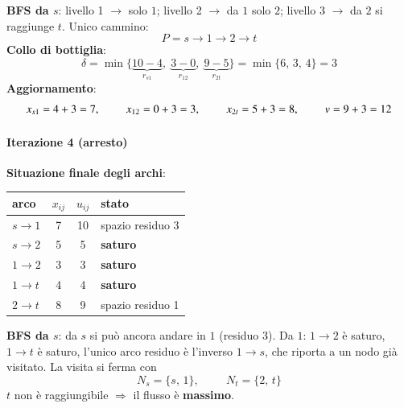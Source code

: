 \documentclass[12pt]{extarticle} %
\begin{document}
\noindent\textbf{BFS da $s$}: livello 1 $\to$ solo $1$; livello 2 $\to$ da $1$ solo $2$; livello 3 $\to$ da $2$ si raggiunge $t$. Unico cammino:
\[
P = s \to 1 \to 2 \to t
\]
\textbf{Collo di bottiglia}:
\[
\delta = \min\{\underbrace{10-4}_{r_{s1}},\; \underbrace{3-0}_{r_{12}},\; \underbrace{9-5}_{r_{2t}}\} = \min\{6,\,3,\,4\} = 3
\]
\textbf{Aggiornamento}:
\[
x_{s1} = 4+3 = 7, \hspace{0.8cm} x_{12} = 0+3 = 3, \hspace{0.8cm} x_{2t} = 5+3 = 8, \hspace{0.8cm} v = 9+3 = 12
\]

\paragraph{Iterazione 4 (arresto)}
\textbf{Situazione finale degli archi}:
\begin{center}
\begin{tabular}{lccl}
\hline
\textbf{arco} & \textbf{$x_{ij}$} & \textbf{$u_{ij}$} & \textbf{stato} \\
\hline
$s\to1$ & 7 & 10 & spazio residuo 3 \\
$s\to2$ & 5 & 5 & \textbf{saturo} \\
$1\to2$ & 3 & 3 & \textbf{saturo} \\
$1\to t$ & 4 & 4 & \textbf{saturo} \\
$2\to t$ & 8 & 9 & spazio residuo 1 \\
\hline
\end{tabular}
\end{center}
\textbf{BFS da $s$}: da $s$ si può ancora andare in $1$ (residuo 3). Da $1$: $1\to2$ è saturo, $1\to t$ è saturo, l'unico arco residuo è l'inverso $1\to s$, che riporta a un nodo già visitato. La visita si ferma con
\[
N_s = \{s,\,1\}, \hspace{1cm} N_t = \{2,\,t\}
\]
$t$ non è raggiungibile $\Rightarrow$ il flusso è \textbf{massimo}.
\end{document}
